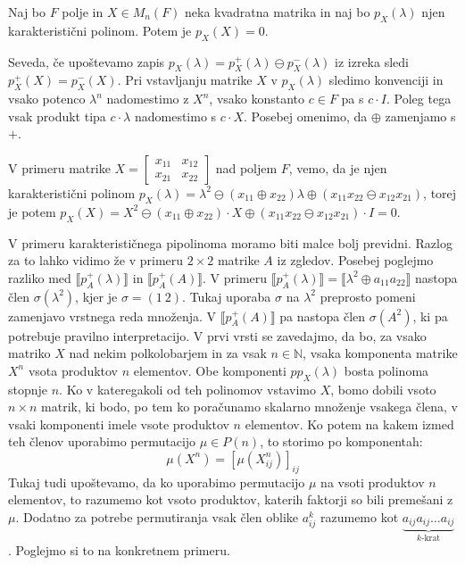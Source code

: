 \documentclass[mat1]{fmfdelo}
\newcommand{\N}{\mathbb{N}}
\begin{document}
\begin{izrek}
	Naj bo $F$ polje in $X\in M_n(F)$ neka kvadratna matrika in naj bo $p_X(\lambda)$ njen karakteristični polinom. Potem je $p_X(X) = 0$.
\end{izrek}

Seveda, če upoštevamo zapis $p_X(\lambda) = p_X^{+}(\lambda) \ominus p_X^{-}(\lambda)$ iz izreka sledi $p_X^{+}(X) = p_X^{-}(X)$. Pri vstavljanju matrike $X$ v $p_X(\lambda)$ sledimo konvenciji in vsako potenco $\lambda^n$ nadomestimo z $X^n$, vsako konstanto $c\in F$ pa s $c\cdot I$. Poleg tega vsak produkt tipa $c\cdot \lambda$ nadomestimo s $c\cdot X$. Posebej omenimo, da $\oplus$ zamenjamo s $+$.

V primeru matrike $X = \begin{bmatrix}
	x_{11} & x_{12} \\
	x_{21} & x_{22}
\end{bmatrix}$ nad poljem $F$, vemo, da je njen karakteristični polinom $p_X(\lambda) = \lambda^2 \ominus (x_{11} \oplus x_{22})\lambda \oplus (x_{11}x_{22} \ominus x_{12}x_{21})$, torej je potem $p_X(X) = X^2 \ominus (x_{11} \oplus x_{22})\cdot X \oplus (x_{11}x_{22} \ominus x_{12}x_{21})\cdot I = 0$. 

V primeru karakterističnega pipolinoma moramo biti malce bolj previdni. Razlog za to lahko vidimo že v primeru $2\times 2$ matrike $A$ iz zgledov. Posebej poglejmo razliko med $\llbracket p_A^{+}(\lambda)\rrbracket$ in $\llbracket p_A^{+}(A)\rrbracket$. V primeru $\llbracket p_A^{+}(\lambda) \rrbracket = \llbracket \lambda^2 \oplus a_{11}a_{22}\rrbracket$ nastopa člen $\sigma(\lambda^2)$, kjer je $\sigma = (1~2)$. Tukaj uporaba $\sigma$ na $\lambda^2$ preprosto pomeni zamenjavo vrstnega reda množenja. V $\llbracket p_A^{+}(A)\rrbracket$ pa nastopa člen $\sigma(A^2)$, ki pa potrebuje pravilno interpretacijo. V prvi vrsti se zavedajmo, da bo, za vsako matriko $X$ nad nekim polkolobarjem in za vsak $n\in\N$, vsaka komponenta matrike $X^n$ vsota produktov $n$ elementov. Obe komponenti $pp_X(\lambda)$ bosta polinoma stopnje $n$. Ko v kateregakoli od teh polinomov vstavimo $X$, bomo dobili vsoto $n\times n$ matrik, ki bodo, po tem ko poračunamo skalarno množenje vsakega člena, v vsaki komponenti imele vsote produktov $n$ elementov. Ko potem na kakem izmed teh členov uporabimo permutacijo $\mu\in P(n)$, to storimo po komponentah: $$\mu(X^n) = \left[\mu(X^n_{ij})\right]_{ij}$$ Tukaj tudi upoštevamo, da ko uporabimo permutacijo $\mu$ na vsoti produktov $n$ elementov, to razumemo kot vsoto produktov, katerih faktorji so bili premešani z $\mu$. Dodatno za potrebe permutiranja vsak člen oblike $a_{ij}^k$ razumemo kot $\underbrace{a_{ij}a_{ij}\ldots a_{ij}}_{\text{$k$-krat}}$. Poglejmo si to na konkretnem primeru.
\end{document}
